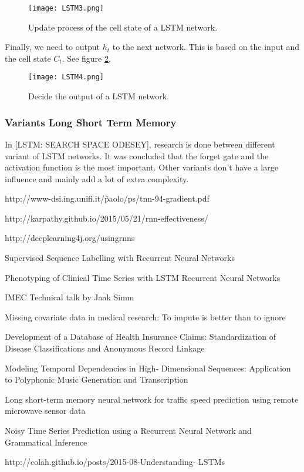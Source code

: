\begin{figure}[H]
	\centering
	\texttt{[image: LSTM3.png]}
	\caption{Update process of the cell state of a LSTM network.}
	\label{fig:LSTM3}
\end{figure} 

Finally, we need to output $h_t$ to the next network. This is based on the input and the cell state $C_t$. See figure \ref{fig:LSTM4}.

\begin{figure}[H]
	\centering
	\texttt{[image: LSTM4.png]}
	\caption{Decide the output of a LSTM network.}
	\label{fig:LSTM4}
\end{figure} 


\subsubsection{Variants Long Short Term Memory}

In [LSTM: SEARCH SPACE ODESEY], research is done between different variant of LSTM networks. It was concluded that the forget gate and the activation function is the most important. Other variants don't have a large influence and mainly add a lot of extra complexity.


http://www-dsi.ing.unifi.it/\~paolo/ps/tnn-94-gradient.pdf


http://karpathy.github.io/2015/05/21/rnn-effectiveness/

http://deeplearning4j.org/usingrnns

Supervised Sequence Labelling with Recurrent Neural
Networks

Phenotyping of Clinical Time Series with LSTM
Recurrent Neural Networks

IMEC Technical talk by Jaak Simm

Missing covariate data in medical research: To impute
is better than to ignore


Development of a Database of Health Insurance
Claims: Standardization of Disease Classifications and
Anonymous Record Linkage

Modeling Temporal Dependencies in High-
Dimensional Sequences: Application to Polyphonic
Music Generation and Transcription

Long short-term memory neural network for traffic
speed prediction using remote microwave sensor data


Noisy Time Series Prediction using a Recurrent Neural
Network and Grammatical Inference


http://colah.github.io/posts/2015-08-Understanding-
LSTMs

